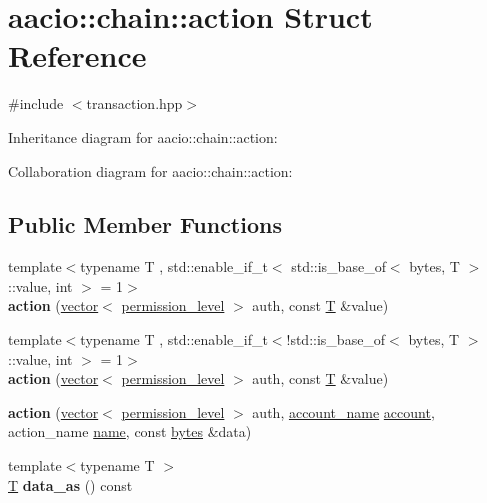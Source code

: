 \hypertarget{structaacio_1_1chain_1_1action}{}\section{aacio\+:\+:chain\+:\+:action Struct Reference}
\label{structaacio_1_1chain_1_1action}


{\ttfamily \#include $<$transaction.\+hpp$>$}



Inheritance diagram for aacio\+:\+:chain\+:\+:action\+:


Collaboration diagram for aacio\+:\+:chain\+:\+:action\+:
\subsection*{Public Member Functions}
\begin{DoxyCompactItemize}
\item 
\mbox{\label{structaacio_1_1chain_1_1action_aa96ccc401f8ad3640a1bd8dd6a9be310}} 
{\footnotesize template$<$typename T , std\+::enable\+\_\+if\+\_\+t$<$ std\+::is\+\_\+base\+\_\+of$<$ bytes, T $>$\+::value, int $>$  = 1$>$ }\\{\bfseries action} (\mbox{\hyperlink{classstd_1_1vector}{vector}}$<$ \mbox{\hyperlink{structaacio_1_1chain_1_1permission__level}{permission\+\_\+level}} $>$ auth, const \mbox{\hyperlink{struct_t}{T}} \&value)
\item 
\mbox{\label{structaacio_1_1chain_1_1action_aa96ccc401f8ad3640a1bd8dd6a9be310}} 
{\footnotesize template$<$typename T , std\+::enable\+\_\+if\+\_\+t$<$!std\+::is\+\_\+base\+\_\+of$<$ bytes, T $>$\+::value, int $>$  = 1$>$ }\\{\bfseries action} (\mbox{\hyperlink{classstd_1_1vector}{vector}}$<$ \mbox{\hyperlink{structaacio_1_1chain_1_1permission__level}{permission\+\_\+level}} $>$ auth, const \mbox{\hyperlink{struct_t}{T}} \&value)
\item 
\mbox{\label{structaacio_1_1chain_1_1action_a8b6bfd9e6b688fa629c3702095d4534b}} 
{\bfseries action} (\mbox{\hyperlink{classstd_1_1vector}{vector}}$<$ \mbox{\hyperlink{structaacio_1_1chain_1_1permission__level}{permission\+\_\+level}} $>$ auth, \mbox{\hyperlink{structaacio_1_1chain_1_1name}{account\+\_\+name}} \mbox{\hyperlink{structaccount}{account}}, action\+\_\+name \mbox{\hyperlink{structaacio_1_1chain_1_1name}{name}}, const \mbox{\hyperlink{classstd_1_1vector}{bytes}} \&data)
\item 
\mbox{\label{structaacio_1_1chain_1_1action_a14f4f5cad837026c20f3364142d66967}} 
{\footnotesize template$<$typename T $>$ }\\\mbox{\hyperlink{struct_t}{T}} {\bfseries data\+\_\+as} () const
\end{DoxyCompactItemize}
